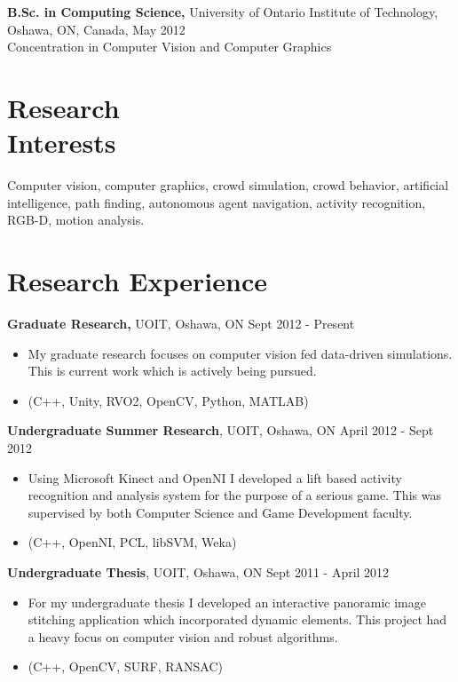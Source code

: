 \documentclass[margin]{res}
\begin{document}
\begin{resume}
{\bf B.Sc. in Computing Science,} University of Ontario Institute of Technology, \\
Oshawa, ON, Canada, May 2012 \\
Concentration in Computer Vision and Computer Graphics

\section{Research\\ Interests}
Computer vision, computer graphics, crowd simulation, crowd behavior, artificial intelligence, path finding, autonomous agent navigation,  activity recognition, RGB-D, motion analysis.
 
\section{Research Experience}
 {\bf Graduate Research,} UOIT, Oshawa, ON \hfill Sept 2012 - Present
 \begin{itemize} \itemsep -2pt  %
 \item My graduate research focuses on computer vision fed data-driven simulations.  This is current work which is actively being pursued.
 \item (C++, Unity, RVO2, OpenCV, Python, MATLAB)
 \end{itemize}

{\bf Undergraduate Summer Research}, UOIT, Oshawa, ON \hfill April 2012 - Sept 2012
\begin{itemize} \itemsep -2pt
\item Using Microsoft Kinect and OpenNI I developed a lift based activity recognition and analysis system for the purpose of a serious game.  This was supervised by both Computer Science and Game Development faculty. 
\item (C++, OpenNI, PCL, libSVM, Weka)
\end{itemize}

{\bf Undergraduate Thesis}, UOIT, Oshawa, ON \hfill Sept 2011 - April 2012
\begin{itemize} \itemsep -2pt
\item For my undergraduate thesis I developed an interactive panoramic image stitching application which incorporated dynamic elements.  This project had a heavy focus on computer vision and robust algorithms.
\item (C++, OpenCV, SURF, RANSAC)
\end{itemize}


\end{resume}
\end{document}
